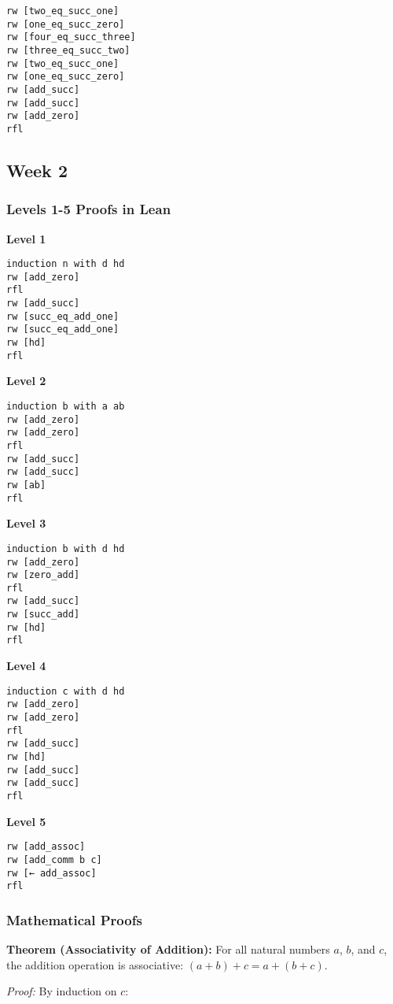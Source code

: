 \documentclass{article}
\theoremstyle{theorem}
\theoremstyle{definition}
\theoremstyle{remark}
\begin{document}
\begin{verbatim}
rw [two_eq_succ_one]
rw [one_eq_succ_zero]
rw [four_eq_succ_three]
rw [three_eq_succ_two]
rw [two_eq_succ_one]
rw [one_eq_succ_zero]
rw [add_succ]
rw [add_succ]
rw [add_zero]
rfl
\end{verbatim}

\subsection{Week 2}

\subsubsection*{Levels 1-5 Proofs in Lean}

\textbf{Level 1}
\begin{verbatim}
induction n with d hd
rw [add_zero]
rfl
rw [add_succ]
rw [succ_eq_add_one]
rw [succ_eq_add_one]
rw [hd]
rfl
\end{verbatim}

\textbf{Level 2}
\begin{verbatim}
induction b with a ab
rw [add_zero]
rw [add_zero]
rfl
rw [add_succ]
rw [add_succ]
rw [ab]
rfl
\end{verbatim}

\textbf{Level 3}
\begin{verbatim}
induction b with d hd
rw [add_zero]
rw [zero_add]
rfl
rw [add_succ]
rw [succ_add]
rw [hd]
rfl
\end{verbatim}

\textbf{Level 4}
\begin{verbatim}
induction c with d hd
rw [add_zero]
rw [add_zero]
rfl
rw [add_succ]
rw [hd]
rw [add_succ]
rw [add_succ]
rfl
\end{verbatim}

\textbf{Level 5}
\begin{verbatim}
rw [add_assoc]
rw [add_comm b c]
rw [← add_assoc]
rfl
\end{verbatim}

\subsubsection*{Mathematical Proofs}

\textbf{Theorem (Associativity of Addition):} For all natural numbers $a$, $b$, and $c$, the addition operation is associative: $(a + b) + c = a + (b + c)$.

\textit{Proof:} By induction on $c$:
\end{document}
